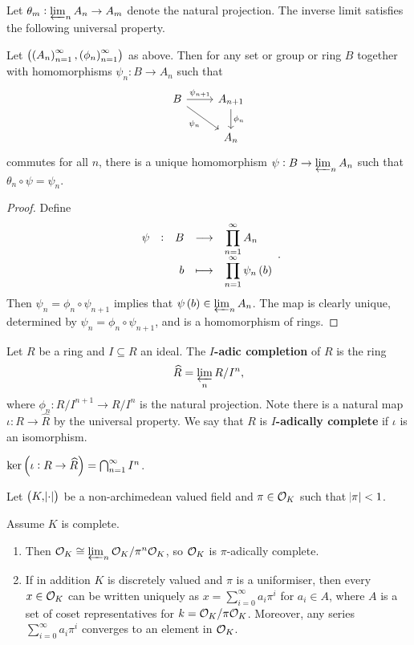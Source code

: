Let $ \theta_m : \varprojlim_n A_n \to A_m $ denote the natural projection. The inverse limit satisfies the following universal property.

\begin{proposition}
Let $ \br{\br{A_n}_{n = 1}^\infty, \br{\phi_n}_{n = 1}^\infty} $ as above. Then for any set or group or ring $ B $ together with homomorphisms $ \psi_n : B \to A_n $ such that
$$
\begin{tikzcd}
B \arrow{r}{\psi_{n + 1}} \arrow{dr}[swap]{\psi_n} & A_{n + 1} \arrow{d}{\phi_n} \\
& A_n
\end{tikzcd}
$$
commutes for all $ n $, there is a unique homomorphism $ \psi : B \to \varprojlim_n A_n $ such that $ \theta_n \circ \psi = \psi_n $.
\end{proposition}

\begin{proof}
Define
$$ \function[\psi]{B}{\displaystyle\prod_{n = 1}^\infty A_n}{b}{\displaystyle\prod_{n = 1}^\infty \psi_n\br{b}}. $$
Then $ \psi_n = \phi_n \circ \psi_{n + 1} $ implies that $ \psi\br{b} \in \varprojlim_n A_n $. The map is clearly unique, determined by $ \psi_n = \phi_n \circ \psi_{n + 1} $, and is a homomorphism of rings.
\end{proof}

\pagebreak

\begin{definition}
Let $ R $ be a ring and $ I \subseteq R $ an ideal. The \textbf{$ I $-adic completion} of $ R $ is the ring
$$ \widehat{R} = \varprojlim_n R / I^n, $$
where $ \phi_n : R / I^{n + 1} \to R / I^n $ is the natural projection. Note there is a natural map $ \iota : R \to \widehat{R} $ by the universal property. We say that $ R $ is \textbf{$ I $-adically complete} if $ \iota $ is an isomorphism.
\end{definition}

\begin{fact*}
$ \ker \br{\iota : R \to \widehat{R}} = \bigcap_{n = 1}^\infty I^n $.
\end{fact*}

Let $ \br{K, \abs{\cdot}} $ be a non-archimedean valued field and $ \pi \in \mathcal{O}_K $ such that $ \abs{\pi} < 1 $.

\begin{proposition}
\label{prop:3.5}
Assume $ K $ is complete.
\begin{enumerate}
\item Then $ \mathcal{O}_K \cong \varprojlim_n \mathcal{O}_K / \pi^n\mathcal{O}_K $, so $ \mathcal{O}_K $ is $ \pi $-adically complete.
\item If in addition $ K $ is discretely valued and $ \pi $ is a uniformiser, then every $ x \in \mathcal{O}_K $ can be written uniquely as $ x = \sum_{i = 0}^\infty a_i\pi^i $ for $ a_i \in A $, where $ A $ is a set of coset representatives for $ k = \mathcal{O}_K / \pi\mathcal{O}_K $. Moreover, any series $ \sum_{i = 0}^\infty a_i\pi^i $ converges to an element in $ \mathcal{O}_K $.
\end{enumerate}
\end{proposition}

